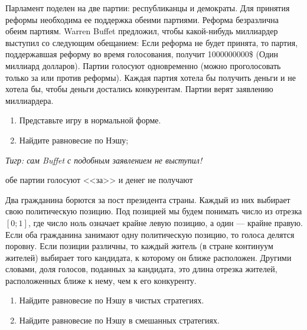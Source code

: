 \begin{problem}
\begin{source}
\cite{miller:gtw}
\end{source}
Парламент поделен на две партии: республиканцы и демократы. Для принятия реформы необходима ее поддержка обеими партиями. Реформа безразлична обеим партиям. Warren Buffet предложил, чтобы какой-нибудь миллиардер выступил со следующим обещанием: Если реформа не будет принята, то партия, поддержавшая реформу во время голосования, получит 1000000000\$ (Один миллиард долларов). Партии голосуют одновременно (можно проголосовать только за или против реформы). Каждая партия хотела бы получить деньги и не хотела бы, чтобы деньги достались конкурентам. Партии верят заявлению миллиардера.\par
\begin{enumerate}
\item  Представьте игру в нормальной форме.\par
\item Найдите равновесие по Нэшу;\par
\end{enumerate}
{\it Тигр: сам Buffet  с подобным заявлением не выступил!}




\begin{sol}
обе партии голосуют <<за>> и денег не получают
\end{sol}
\end{problem}





\begin{problem}
Два гражданина борются за пост президента страны. Каждый из них выбирает свою политическую позицию. Под позицией мы будем понимать число из отрезка  $\left[0;1\right]$, где число ноль означает крайне левую позицию, а один --- крайне правую. Если оба гражданина занимают одну политическую позицию, то голоса делятся поровну. Если позиции различны, то каждый житель (в стране континуум жителей) выбирает того кандидата, к которому он ближе расположен. Другими словами, доля голосов, поданных за кандидата, это длина отрезка жителей, расположенных ближе к нему, чем к его конкуренту.
\begin{enumerate}
\item 	Найдите равновесие по Нэшу в чистых стратегиях.

\item 	Найдите равновесие по Нэшу в смешанных стратегиях.
\end{enumerate}


\begin{sol}

\end{sol}
\end{problem}



